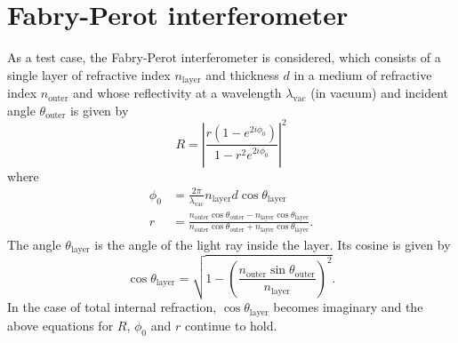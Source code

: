 \documentclass[]{article}
\begin{document}
	\section{Fabry-Perot interferometer}
	As a test case, the Fabry-Perot interferometer is considered, which consists of a single layer of refractive index $n_\text{layer}$ and thickness $d$ in a medium of refractive index $n_\text{outer}$ and whose reflectivity at a wavelength $\lambda_\text{vac}$ (in vacuum) and incident angle $\theta_\text{outer}$ is given by
	\begin{equation}
		R=\left|\frac{r(1-e^{2i\phi_0})}{1-r^2 e^{2i\phi_0}}\right|^2
	\end{equation}
	where 
	\begin{align}
		\phi_0&=\frac{2\pi}{\lambda_\text{vac}}n_\text{layer}d\cos\theta_\text{layer}\\
		r&=\frac{n_\text{outer}\cos\theta_\text{outer}-n_\text{layer}\cos\theta_\text{layer}}{n_\text{outer}\cos\theta_\text{outer}+n_\text{layer}\cos\theta_\text{layer}}.
	\end{align}
	The angle $\theta_\text{layer}$ is the angle of the light ray inside the layer. Its cosine is given by
	\begin{equation}
		\cos\theta_\text{layer}=\sqrt{1-\left(\frac{n_\text{outer}\sin\theta_\text{outer}}{n_\text{layer}}\right)^2}.
	\end{equation}
	In the case of total internal refraction, $\cos\theta_\text{layer}$ becomes imaginary and the above equations for $R$, $\phi_0$ and $r$ continue to hold.
	
%	
%	
	
\end{document}
